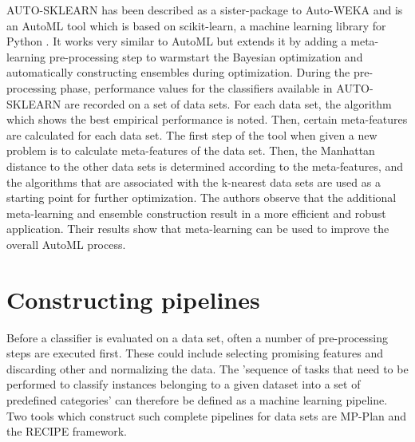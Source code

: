 AUTO-SKLEARN has been described as a sister-package to Auto-WEKA and is an AutoML tool which is based on scikit-learn, a machine learning library for Python \cite{feurer2015efficient}. It works very similar to AutoML but extends it by adding a meta-learning pre-processing step to warmstart the Bayesian optimization and automatically constructing ensembles during optimization. During the pre-processing phase, performance values for the classifiers available in AUTO-SKLEARN are recorded on a set of data sets. For each data set, the algorithm which shows the best empirical performance is noted. Then, certain meta-features are calculated for each data set. The first step of the tool when given a new problem is to calculate meta-features of the data set. Then, the Manhattan distance to the other data sets is determined according to the meta-features, and the algorithms that are associated with the k-nearest data sets are used as a starting point for further optimization. The authors observe that the additional meta-learning and ensemble construction result in a more efficient and robust application. Their results show that meta-learning can be used to improve the overall AutoML process.\\

\section{Constructing pipelines}
Before a classifier is evaluated on a data set, often a number of pre-processing steps are executed first. These could include selecting promising features and discarding other and normalizing the data. The 'sequence of tasks that need to be performed to classify instances belonging to a given dataset into a set of predefined categories' \cite{DBLP:conf/eurogp/SaPOP17} can therefore be defined as a machine learning pipeline. Two tools which construct such complete pipelines for data sets are MP-Plan and the RECIPE framework.

